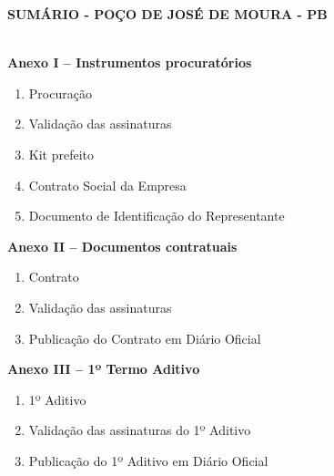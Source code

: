\documentclass[
]{article}
\author{}
\date{}
\begin{document}
\textbf{SUMÁRIO - POÇO DE JOSÉ DE MOURA - PB}\\

\strut \\

\textbf{Anexo I -- Instrumentos procuratórios }
\begin{enumerate}
    \item Procuração  
    \item Validação das assinaturas 
    \item Kit prefeito 
    \item Contrato Social da Empresa  
    \item Documento de Identificação do Representante  
\end{enumerate}

\textbf{Anexo II -- Documentos contratuais }
\begin{enumerate}
    \item Contrato 
    \item Validação das assinaturas 
    \item Publicação do Contrato em Diário Oficial 
\end{enumerate}

\textbf{Anexo III -- 1º Termo Aditivo }
\begin{enumerate}
    \item 1º Aditivo 
        \item Validação das assinaturas do 1º Aditivo 
    \item Publicação do 1º Aditivo em Diário Oficial 
\end{enumerate}
\end{document}
